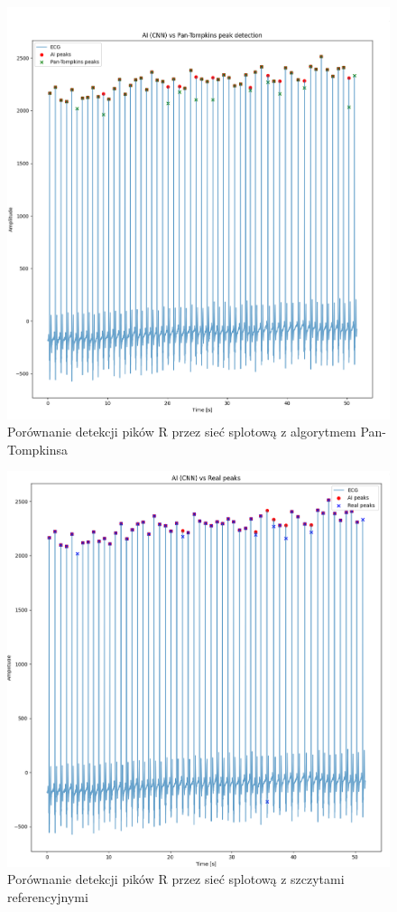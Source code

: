 \documentclass[journal]{IEEEtran}
\begin{document}
{\begin{figure}[htbp]
    \centering
    \includegraphics[scale=0.2]{ai_pan-tompkins.png}
    \caption{Porównanie detekcji pików R przez sieć splotową z algorytmem Pan-Tompkinsa}
    \label{fig:ai_pan-tompkins}
\end{figure}

\begin{figure}[htbp]
    \centering
    \includegraphics[scale=0.2]{ai_real_peaks.png}
    \caption{Porównanie detekcji pików R przez sieć splotową z szczytami referencyjnymi}
    \label{fig:ai_real_peaks}
\end{figure}


}
\end{document}
